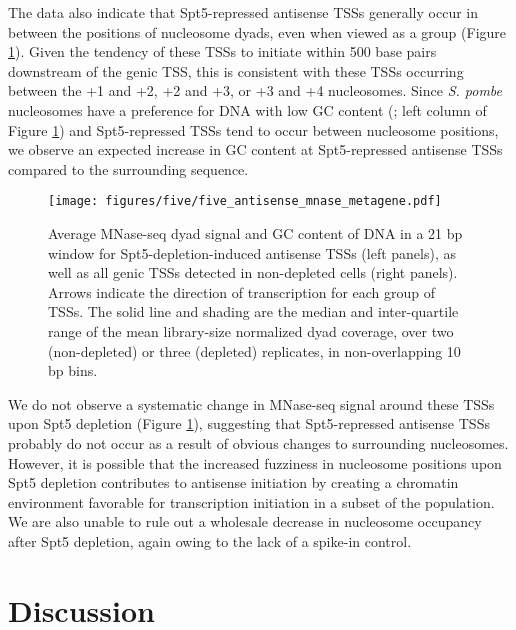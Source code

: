 The data also indicate that Spt5-repressed antisense TSSs generally occur in between the positions of nucleosome dyads, even when viewed as a group (Figure \ref{fig:five_antisense_mnase_metagene}).
Given the tendency of these TSSs to initiate within 500 base pairs downstream of the genic TSS, this is consistent with these TSSs occurring between the +1 and +2, +2 and +3, or +3 and +4 nucleosomes.
Since \textit{S. pombe} nucleosomes have a preference for DNA with low GC content (\citet{moyle-heyrman2013}; left column of Figure \ref{fig:five_antisense_mnase_metagene}) and Spt5-repressed TSSs tend to occur between nucleosome positions, we observe an expected increase in GC content at Spt5-repressed antisense TSSs compared to the surrounding sequence.

\begin{figure}[h]
    \texttt{[image: figures/five/five\_antisense\_mnase\_metagene.pdf]}
    \caption[Average MNase-seq dyad signal and GC content in Spt5-depleted and non-depleted cells, flanking all antisense TSSs upregulated in Spt5-depleted cells, as well as all genic TSSs detected in non-depleted cells.]{Average MNase-seq dyad signal and GC content of DNA in a 21 bp window for Spt5-depletion-induced antisense TSSs (left panels), as well as all genic TSSs detected in non-depleted cells (right panels). Arrows indicate the direction of transcription for each group of TSSs. The solid line and shading are the median and inter-quartile range of the mean library-size normalized dyad coverage, over two (non-depleted) or three (depleted) replicates, in non-overlapping 10 bp bins.
}
    \label{fig:five_antisense_mnase_metagene}
\end{figure}

We do not observe a systematic change in MNase-seq signal around these TSSs upon Spt5 depletion (Figure \ref{fig:five_antisense_mnase_metagene}), suggesting that Spt5-repressed antisense TSSs probably do not occur as a result of obvious changes to surrounding nucleosomes.
However, it is possible that the increased fuzziness in nucleosome positions upon Spt5 depletion contributes to antisense initiation by creating a chromatin environment favorable for transcription initiation in a subset of the population.
We are also unable to rule out a wholesale decrease in nucleosome occupancy after Spt5 depletion, again owing to the lack of a spike-in control.

\section{Discussion}

